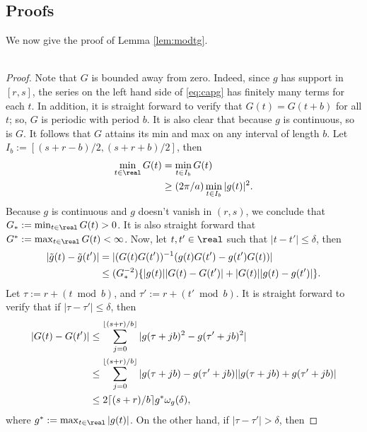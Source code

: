 \begin{appendices}
  \chapter{Proofs}\label{ap:proof}
  We now give the proof of Lemma \eqref{lem:modtg}. \\ \\
  \begin{proof}
  Note that $G$ is bounded away from zero. Indeed, since $g$ has support in  $[r,s]$, the series on the left hand side of \eqref{eq:capg} has finitely many terms for each $t$.  In addition, it is straight forward to verify that $G(t) = G(t+b)$ for all $t$; so,  $G$ is periodic with period $b$. It is also clear that because $g$ is continuous, so is $G$. It follows that $G$ attains its min and max on any interval of length $b$. Let $I_b := [(s+r -b)/2, (s+r +b)/2]$, then
  \begin{align}
    \min_{t\in\real} G(t) &=  \min_{t \in I_b} G(t) \notag\\
    & \ge (2\pi/a) \min_{t \in I_b}\vert g(t)\vert^2.\notag
    \label{}
  \end{align}  
  Because $g$ is continuous and $g$ doesn't vanish in $(r,s)$, we conclude that $G_*:=\min_{t \in \real}G(t) > 0$. It is also straight forward that $G^* := \max_{t \in \real}G(t) < \infty$. Now, let $t, t' \in \real$ such that $\vert t - t' \vert \le \delta$, then 
  \begin{align}
    \vert \tilde{g}(t) - \tilde{g}(t')\vert & = \vert (G(t)G(t'))^{-1}(g(t)G(t') - g(t')G(t))\vert  \notag\\
    & \le (G_*^{-2})\{\vert g(t)\vert \vert G(t) - G(t') \vert + \vert G(t)\vert \vert g(t) - g(t')\vert\}. 
    \label{eq:difftg}
  \end{align}
Let $\tau := r +  (t \bmod {b})$, and $\tau':=r + (t' \bmod{b})$. It is straight forward to verify that if  $\vert \tau - \tau' \vert \le \delta$, then
\begin{align}
  \vert G(t) - G(t') \vert & \le  \sum_{j = 0}^{\lfloor (s + r)/b \rfloor} \vert g(\tau + j b)^2 - g(\tau' + j b)^2\vert\notag\\
  & \le \sum_{j = 0}^{\lfloor (s + r)/b \rfloor} \vert g(\tau + j b) - g(\tau' + j b) \vert \vert g(\tau + j b) + g(\tau' + j b)\vert\notag\\
  & \le 2 \lceil (s + r)/b\rceil g^*\omega_g(\delta),
  \label{}
\end{align}
where $g^* := \max_{t \in \real} \vert g(t)\vert $. On the other hand, if $\vert \tau - \tau'\vert > \delta$, then 

\end{proof}
\end{appendices}
